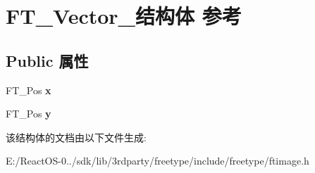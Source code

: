 \hypertarget{struct_f_t___vector__}{}\section{F\+T\+\_\+\+Vector\+\_\+结构体 参考}
\label{struct_f_t___vector__}
\subsection*{Public 属性}
\begin{DoxyCompactItemize}
\item 
\mbox{\label{struct_f_t___vector___a941e818e6dfca06409cddff4f325f74c}} 
F\+T\+\_\+\+Pos {\bfseries x}
\item 
\mbox{\label{struct_f_t___vector___ac3246ed214e880047ec74eeb15f8b973}} 
F\+T\+\_\+\+Pos {\bfseries y}
\end{DoxyCompactItemize}


该结构体的文档由以下文件生成\+:\begin{DoxyCompactItemize}
\item 
E\+:/\+React\+O\+S-\/0../sdk/lib/3rdparty/freetype/include/freetype/ftimage.\+h\end{DoxyCompactItemize}
